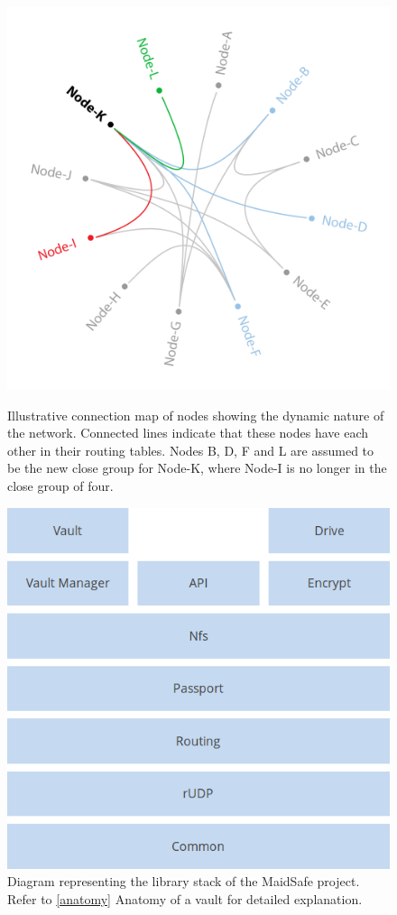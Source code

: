 \documentclass[twocolumn,english]{article}
\begin{document}
\begin{figure}[hbtp]
\centering
\includegraphics[scale=0.2]{connection-map.png}
\caption{Illustrative connection map of nodes showing the dynamic nature of the network. Connected lines indicate that these nodes have each other in their routing tables.  Nodes B, D, F and L are assumed to be the new close group for Node-K, where Node-I is no longer in the close group of four.}
\vspace{1cm}
\includegraphics[scale=0.35]{stack.png}
\caption{Diagram representing the library stack of the MaidSafe project. Refer to \ref{anatomy} Anatomy of a vault for detailed explanation.}
\end{figure}
\end{document}
